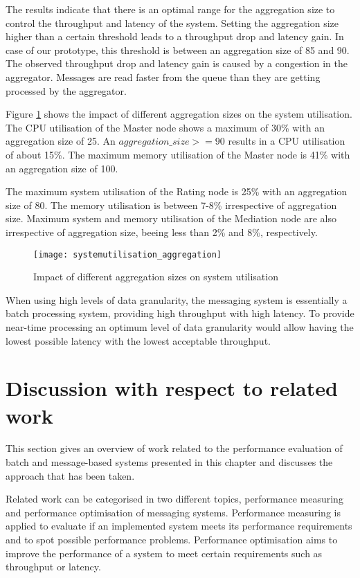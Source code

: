 The results indicate that there is an optimal range for the aggregation size to control the throughput and latency of the system. Setting the aggregation size higher than a certain threshold leads to a throughput drop and latency gain. In case of our prototype, this threshold is between an aggregation size of 85 and 90. The observed throughput drop and latency gain is caused by a congestion in the aggregator. Messages are read faster from the queue than they are getting processed by the aggregator.

Figure \ref{fig:ch4_systemutilisation_aggregation} shows the impact of different aggregation sizes on the system utilisation. The CPU utilisation of the Master node shows a maximum of 30\% with an aggregation size of 25. An $aggregation\_size >= 90$ results in a CPU utilisation of about 15\%. The maximum memory utilisation of the Master node is 41\% with an aggregation size of 100.

The maximum system utilisation of the Rating node is 25\% with an aggregation size of 80. The memory utilisation is between 7-8\% irrespective of aggregation size. Maximum system and memory utilisation of the Mediation node are also irrespective of aggregation size, beeing less than 2\% and 8\%, respectively.

\begin{figure}[htbp]
	\centering
	\texttt{[image: systemutilisation\_aggregation]}
	\caption{Impact of different aggregation sizes on system utilisation}
	\label{fig:ch4_systemutilisation_aggregation}
\end{figure}

When using high levels of data granularity, the messaging system is essentially a batch processing system, providing high throughput with high latency. To provide near-time processing an optimum level of data granularity would allow having the lowest possible latency with the lowest acceptable throughput.

\section{Discussion with respect to related work}\label{sec:ch4_related_work}
This section gives an overview of work related to the performance evaluation of batch and message-based systems presented in this chapter and discusses the approach that has been taken. 

Related work can be categorised in two different topics, performance measuring and performance optimisation of messaging systems. Performance measuring is applied to evaluate if an implemented system meets its performance requirements and to spot possible performance problems. Performance optimisation aims to improve the performance of a system to meet certain requirements such as throughput or latency.

